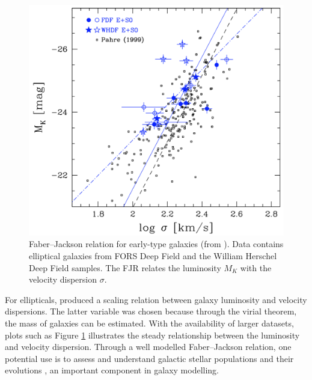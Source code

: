 \documentclass[12pt, twocolumn, nofootinbib]{revtex4-1}    %
\begin{document}
\begin{figure}
\includegraphics[width=\linewidth]{introduction/fritz_2009}
\caption{Faber--Jackson relation for early-type galaxies (from \citealt{2009MNRAS.393.1467F}). Data contains elliptical galaxies from FORS Deep Field and the William Herschel Deep Field samples. The FJR relates the luminosity $M_K$ with the velocity dispersion $\sigma$.}
\label{fig:faber_jackson}
\end{figure}

For ellipticals, \cite{1976ApJ...204..668F} produced a scaling relation between galaxy luminosity and velocity dispersions. The latter variable was chosen because through the virial theorem, the mass of galaxies can be estimated. With the availability of larger datasets, plots such as Figure \ref{fig:faber_jackson} illustrates the steady relationship between the luminosity and velocity dispersion. Through a well modelled Faber--Jackson relation, one potential use is to assess and understand galactic stellar populations and their evolutions \citep{2009MNRAS.393.1467F}, an important component in galaxy modelling.
\end{document}
